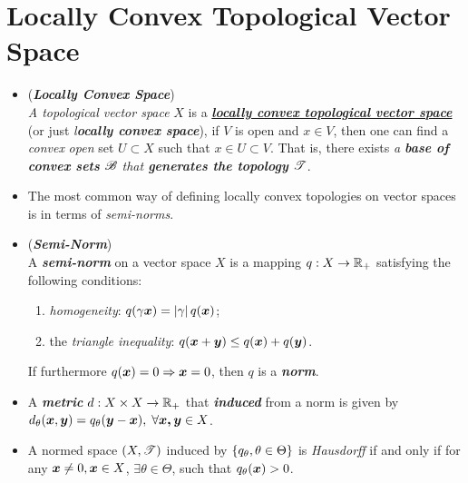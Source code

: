 \documentclass[11pt]{article}
\begin{document}
\section{Locally Convex Topological Vector Space}
\begin{itemize}
\item \begin{definition} (\emph{\textbf{Locally Convex Space}})\\
\emph{A topological vector space} $X$ is a \underline{\emph{\textbf{locally convex topological vector space}}} (or just \emph{l\textbf{ocally convex space}}), if $V$ is open and $x \in V$, then one can find a \emph{convex} \emph{open} set $U\subset X$ such that $x \in U\subset V$. That is, there exists \emph{a \textbf{base of convex sets} ${\mathscr B}$ that \textbf{generates the topology} ${\mathscr T}$}. 
\end{definition}

\item \begin{remark}
The most common way of defining locally convex topologies on vector spaces is in terms of \emph{semi-norms}. 
\end{remark}

\item  \begin{definition} (\emph{\textbf{Semi-Norm}})\\
A \emph{\textbf{semi-norm}} on a vector space $X$ is a mapping $q: X\rightarrow {\mathbb R}_{+}$ satisfying the following conditions: 
\begin{enumerate}
\item \emph{homogeneity}: $q(\gamma \boldsymbol{x}) = \left\lvert \gamma \right\rvert q(\boldsymbol{x})$;
\item the \emph{triangle inequality}: $q(\boldsymbol{x}+\boldsymbol{y})\le q(\boldsymbol{x})+ q(\boldsymbol{y})$.
\end{enumerate}
 If furthermore $q(\boldsymbol{x})=0 \Rightarrow \boldsymbol{x}=0$, then $q$ is a \emph{\textbf{norm}}.
\end{definition}

\item \begin{remark}
 A \emph{\textbf{metric}} $d: X\times X \rightarrow {\mathbb R}_{+}$ that \emph{\textbf{induced}} from a norm is given by $d_{\theta}(\boldsymbol{x}, \boldsymbol{y})= q_{\theta}(\boldsymbol{y}-\boldsymbol{x}),\; \forall \boldsymbol{x,y}\in X $.
 \end{remark}

\item \begin{proposition}
A normed space $(X, {\mathscr T})$ induced by $\left\{q_{\theta},\theta\in \Theta\right\}$ is \emph{Hausdorff} if and only if for any $\boldsymbol{x}\neq 0, \boldsymbol{x}\in X$, $\exists \theta\in \Theta$, such that $q_{\theta}(\boldsymbol{x})>0$.
\end{proposition}


\end{itemize}
\end{document}

